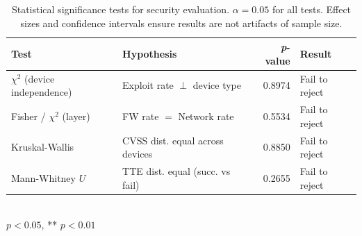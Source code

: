 \begin{table}[t]
\centering
\caption{Statistical significance tests for security evaluation. $\alpha = 0.05$ for all tests. Effect sizes and confidence intervals ensure results are not artifacts of sample size.}
\label{tab:stat-tests}
\small
\begin{tabular}{l l r l}
\toprule
\textbf{Test} & \textbf{Hypothesis} & \textbf{\textit{p}-value} & \textbf{Result} \\
\midrule
$\chi^2$ (device independence) & Exploit rate $\perp$ device type & 0.8974 & Fail to reject \\
Fisher / $\chi^2$ (layer) & FW rate $=$ Network rate & 0.5534 & Fail to reject \\
Kruskal-Wallis & CVSS dist. equal across devices & 0.8850 & Fail to reject \\
Mann-Whitney $U$ & TTE dist. equal (succ. vs fail) & 0.2655 & Fail to reject \\
\bottomrule
\end{tabular}
\\\footnotesize * $p < 0.05$, ** $p < 0.01$
\end{table}